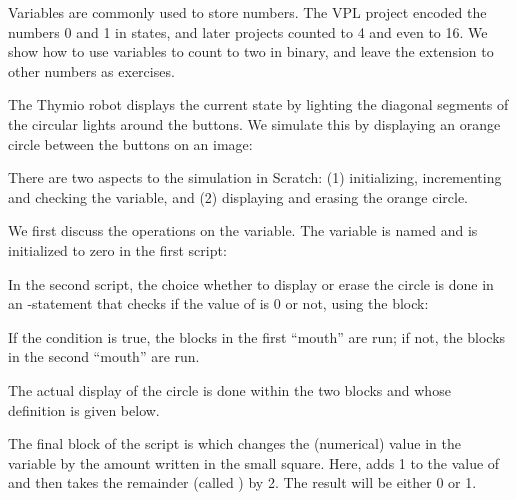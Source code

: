 Variables are commonly used to store numbers. The VPL project
 encoded the numbers 0 and 1 in states, and later
projects counted to 4 and even to 16. We show how to use variables to
count to two in binary, and leave the extension to other numbers as
exercises.

The Thymio robot displays the current state by lighting the
diagonal segments of the circular lights around the buttons. We simulate
this by displaying an orange circle between the buttons on an image:


There are two aspects to the simulation in Scratch: (1) initializing,
incrementing and checking the variable, and (2) displaying and erasing
the orange circle.

We first discuss the operations on the variable. The variable is named
 and is initialized to zero in the first script:


In the second script, the choice whether to display or erase the circle
is done in an -statement that checks if the value of
 is 0 or not, using the  block:


If the condition is true, the blocks in the first ``mouth'' are run; if
not, the blocks in the second ``mouth'' are run.

The actual display of the circle is done within the two blocks
 and  whose definition is
given below.

The final block of the script is  which changes the
(numerical) value in the variable by the amount written in the small
square. Here,  adds 1 to the value of 
and then takes the remainder (called ) by 2. The result will be
either 0 or 1.



